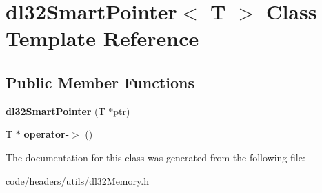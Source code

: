 \hypertarget{classdl32_smart_pointer}{\section{dl32\-Smart\-Pointer$<$ T $>$ Class Template Reference}
\label{classdl32_smart_pointer}
}
\subsection*{Public Member Functions}
\begin{DoxyCompactItemize}
\item 
\hypertarget{classdl32_smart_pointer_a8b0276e4bd85d3c7b626602d1087578d}{{\bfseries dl32\-Smart\-Pointer} (T $\ast$ptr)}\label{classdl32_smart_pointer_a8b0276e4bd85d3c7b626602d1087578d}

\item 
\hypertarget{classdl32_smart_pointer_a3d7c285602dfd3470d3678a254c3eef1}{T $\ast$ {\bfseries operator-\/$>$} ()}\label{classdl32_smart_pointer_a3d7c285602dfd3470d3678a254c3eef1}

\end{DoxyCompactItemize}


The documentation for this class was generated from the following file\-:\begin{DoxyCompactItemize}
\item 
code/headers/utils/dl32\-Memory.\-h\end{DoxyCompactItemize}
